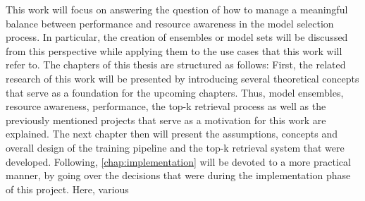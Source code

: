 This work will focus on answering the question of how to manage a meaningful balance between performance and resource awareness in the model selection process. In particular, the creation of ensembles or model sets will be discussed from this perspective while applying them to the use cases that this work will refer to. The chapters of this thesis are structured as follows: First, the related research of this work will be presented by introducing several theoretical concepts that serve as a foundation for the upcoming chapters. Thus, model ensembles, resource awareness, performance, the top-k retrieval process as well as the previously mentioned projects that serve as a motivation for this work are explained. The next chapter then will present the assumptions, concepts and overall design of the training pipeline and the top-k retrieval system that were developed. Following, \autoref{chap:implementation} will be devoted to a more practical manner, by going over the decisions that were during the implementation phase of this project. Here, various 

